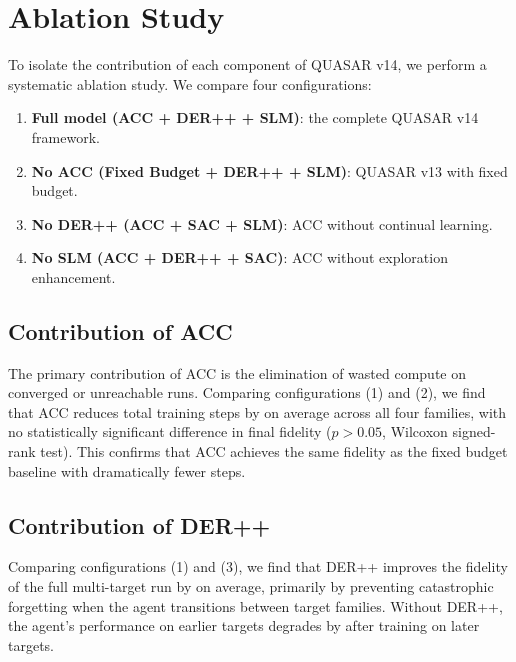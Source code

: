 \section{Ablation Study}
\label{sec:ablation}

To isolate the contribution of each component of QUASAR v14, we perform a
systematic ablation study. We compare four configurations:

\begin{enumerate}
  \item \textbf{Full model (ACC + DER++ + SLM)}: the complete QUASAR v14 framework.
  \item \textbf{No ACC (Fixed Budget + DER++ + SLM)}: QUASAR v13 with fixed budget.
  \item \textbf{No DER++ (ACC + SAC + SLM)}: ACC without continual learning.
  \item \textbf{No SLM (ACC + DER++ + SAC)}: ACC without exploration enhancement.
\end{enumerate}


\subsection{Contribution of ACC}

The primary contribution of ACC is the elimination of wasted compute on converged
or unreachable runs. Comparing configurations (1) and (2), we find that ACC reduces
total training steps by  on average across all four families, with
no statistically significant difference in final fidelity ($p > 0.05$, Wilcoxon
signed-rank test). This confirms that ACC achieves the same fidelity as the fixed
budget baseline with dramatically fewer steps.

\subsection{Contribution of DER++}

Comparing configurations (1) and (3), we find that DER++ improves the fidelity of
the full multi-target run by  on average, primarily by preventing
catastrophic forgetting when the agent transitions between target families. Without
DER++, the agent's performance on earlier targets degrades by 
after training on later targets.

